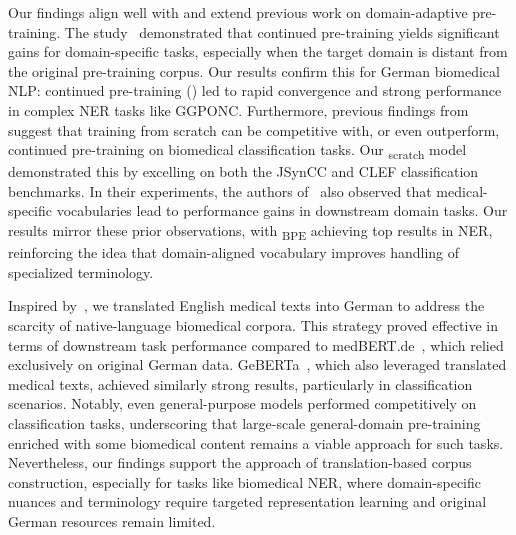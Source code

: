 Our findings align well with and extend previous work on domain-adaptive
pre-training. The study~\cite{gururangan2020don} demonstrated that continued
pre-training yields significant gains for domain-specific tasks, especially when
the target domain is distant from the original pre-training corpus. Our results
confirm this for German biomedical NLP: continued pre-training (\ChristBERT) led
to rapid convergence and strong performance in complex NER tasks like GGPONC.
Furthermore, previous findings from~\cite{el2022re} suggest that training from
scratch can be competitive with, or even outperform, continued pre-training on
biomedical classification tasks. Our \ChristBERT\textsubscript{scratch} model
demonstrated this by excelling on both the JSynCC and CLEF classification
benchmarks. In their experiments, the authors of~\cite{el2022re} also observed
that medical-specific vocabularies lead to performance gains in downstream
domain tasks. Our results mirror these prior observations, with
\ChristBERT\textsubscript{BPE} achieving top results in NER, reinforcing the
idea that domain-aligned vocabulary improves handling of specialized
terminology.

Inspired by~\cite{edunov2018understanding}, we translated English medical texts
into German to address the scarcity of native-language biomedical corpora. This
strategy proved effective in terms of downstream task performance compared to
medBERT.de~\cite{bressem2024medbert}, which relied exclusively on original
German data. GeBERTa~\cite{dada2023impact}, which also leveraged translated
medical texts, achieved similarly strong results, particularly in classification
scenarios. Notably, even general-purpose models performed competitively on
classification tasks, underscoring that large-scale general-domain pre-training
enriched with some biomedical content remains a viable approach for such tasks.
Nevertheless, our findings support the approach of translation-based corpus
construction, especially for tasks like biomedical NER, where domain-specific
nuances and terminology require targeted representation learning and original
German resources remain limited.

